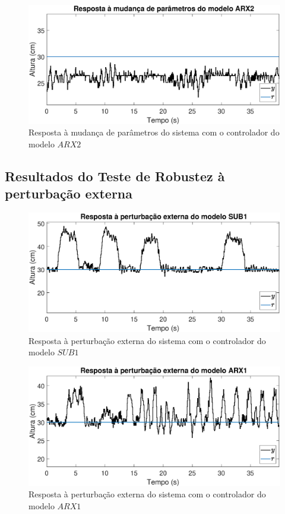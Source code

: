 \begin{figure}[H]
	\centering
	\includegraphics[width=1\linewidth]{mprealarx2}
	\caption[Resposta à mudança de parâmetros do modelo $ARX2$]{Resposta à mudança de parâmetros do sistema com o controlador do modelo $ARX2$}
	\label{fig:mprealarx2}
\end{figure}


\subsection{Resultados do Teste de Robustez à perturbação externa}\label{rpe}

\begin{figure}[H]
	\centering
	\includegraphics[width=1\linewidth]{pextrealsub1}
	\caption[Resposta à perturbação externa do modelo $SUB1$]{Resposta à perturbação externa do sistema com o controlador do modelo $SUB1$}
	\label{fig:pextrealsub1}
\end{figure}

\begin{figure}[H]
	\centering
	\includegraphics[width=1\linewidth]{pextrealarx1}
	\caption[Resposta à perturbação externa do modelo $ARX1$]{Resposta à perturbação externa do sistema com o controlador do modelo $ARX1$}
	\label{fig:pextrealarx1}
\end{figure}

